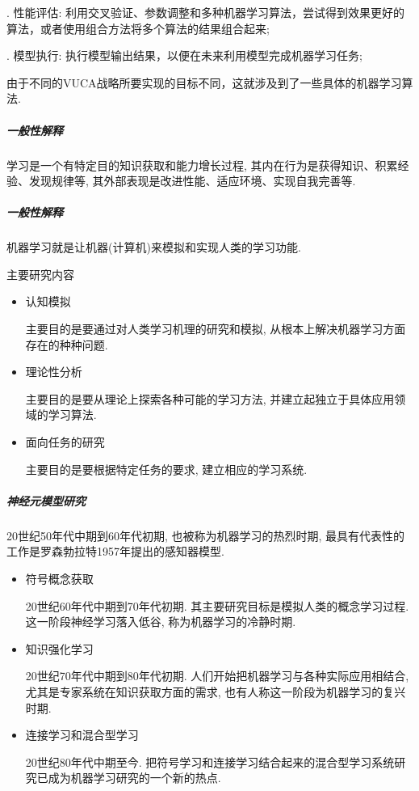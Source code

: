 . 性能评估: 利用交叉验证、参数调整和多种机器学习算法，尝试得到效果更好的算法，或者使用组合方法将多个算法的结果组合起来;

. 模型执行: 执行模型输出结果，以便在未来利用模型完成机器学习任务;

由于不同的VUCA战略所要实现的目标不同，这就涉及到了一些具体的机器学习算法.
\subparagraph{一般性解释}
学习是一个有特定目的知识获取和能力增长过程, 其内在行为是获得知识、积累经验、发现规律等, 其外部表现是改进性能、适应环境、实现自我完善等.
\subparagraph{一般性解释}
机器学习就是让机器(计算机)来模拟和实现人类的学习功能.

主要研究内容
\begin{itemize}
\item 认知模拟

    主要目的是要通过对人类学习机理的研究和模拟, 从根本上解决机器学习方面存在的种种问题.
\item 理论性分析

     主要目的是要从理论上探索各种可能的学习方法, 并建立起独立于具体应用领域的学习算法.
\item 面向任务的研究

    主要目的是要根据特定任务的要求, 建立相应的学习系统.
\end{itemize}
\subparagraph{神经元模型研究}
 20世纪50年代中期到60年代初期, 也被称为机器学习的热烈时期, 最具有代表性的工作是罗森勃拉特1957年提出的感知器模型.
\begin{itemize}
\item 符号概念获取

    20世纪60年代中期到70年代初期. 其主要研究目标是模拟人类的概念学习过程. 这一阶段神经学习落入低谷, 称为机器学习的冷静时期.
\item 知识强化学习

    20世纪70年代中期到80年代初期. 人们开始把机器学习与各种实际应用相结合, 尤其是专家系统在知识获取方面的需求, 也有人称这一阶段为机器学习的复兴时期.
\item 连接学习和混合型学习

    20世纪80年代中期至今. 把符号学习和连接学习结合起来的混合型学习系统研究已成为机器学习研究的一个新的热点.
\end{itemize}

